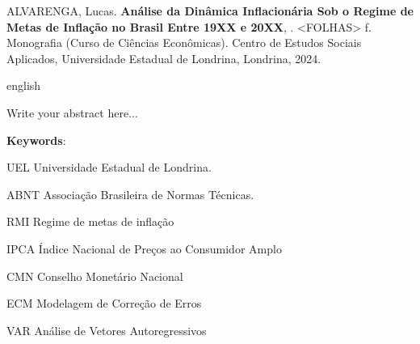 \documentclass[12pt,oneside,a4paper,chapter=TITLE,english,brazil,sumario=abnt-6027-2012]{abntex2}
\begin{document}
\noindent
ALVARENGA, Lucas. {\bfseries Análise da Dinâmica Inflacionária Sob o Regime de Metas de Inflação no Brasil Entre 19XX e 20XX}, \imprimirdata. <FOLHAS> f. Monografia (Curso de Ciências Econômicas). Centro de Estudos Sociais Aplicados, Universidade Estadual de Londrina, Londrina, 2024.

\begin{resumo}[Abstract]
	\begin{otherlanguage*}{english}
		
		Write your abstract here... 
		
		\vspace{\onelineskip}
		
		\noindent 
		\textbf{Keywords}: 
	\end{otherlanguage*}
\end{resumo}
\pagebreak


\listoffigures*
\cleardoublepage


\listoftables*
\cleardoublepage


\begin{siglas}
	\item[UEL] Universidade Estadual de Londrina. 
	\item[ABNT] Associação Brasileira de Normas Técnicas.
	\item[RMI] Regime de metas de inflação
	\item[IPCA] Índice Nacional de Preços ao Consumidor Amplo
	\item[CMN] Conselho Monetário Nacional
	\item[ECM] Modelagem de Correção de Erros
	\item[VAR] Análise de Vetores Autoregressivos
\end{siglas}
\pagebreak




\tableofcontents*
\cleardoublepage


\textual %
\pagestyle{simple}
\end{document}
